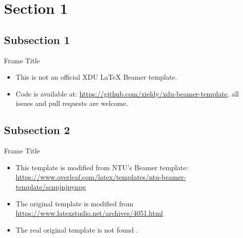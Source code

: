 \section{Section 1}

\subsection{Subsection 1}

\begin{frame}{Frame Title}
    \begin{itemize}[<+-| alert@+>] %
        \item This is not an official XDU \LaTeX{} Beamer template. 
        \item Code is available at: \url{https://github.com/xieldy/xdu-beamer-template}, all issues and pull requests are welcome.
    \end{itemize}
\end{frame}

\subsection{Subsection 2}

\begin{frame}{Frame Title}
    \begin{itemize}
        \item This template is modified from NTU's Beamer template: \url{https://www.overleaf.com/latex/templates/ntu-beamer-template/scnpjnjpynpg}\cite{origin2} \pause
        \item The original template is modified from \newline \url{https://www.latexstudio.net/archives/4051.html}
        \item The real original template is not found \cite{origin}.
    \end{itemize}
\end{frame}